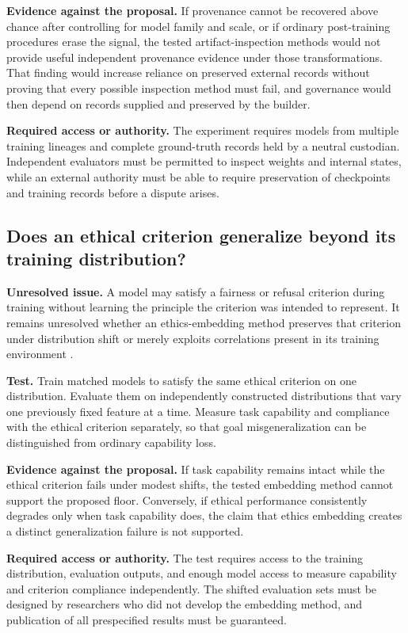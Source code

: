 \textbf{Evidence against the proposal.}
If provenance cannot be recovered above chance after controlling for model family and scale, or if ordinary post-training procedures erase the signal, the tested artifact-inspection methods would not provide useful independent provenance evidence under those transformations. That finding would increase reliance on preserved external records without proving that every possible inspection method must fail, and governance would then depend on records supplied and preserved by the builder.

\textbf{Required access or authority.}
The experiment requires models from multiple training lineages and complete ground-truth records held by a neutral custodian. Independent evaluators must be permitted to inspect weights and internal states, while an external authority must be able to require preservation of checkpoints and training records before a dispute arises.

\subsection*{Does an ethical criterion generalize beyond its training distribution?}
\label{sec:A.shift}
\textbf{Unresolved issue.}
A model may satisfy a fairness or refusal criterion during training without learning the principle the criterion was intended to represent. It remains unresolved whether an ethics-embedding method preserves that criterion under distribution shift or merely exploits correlations present in its training environment \autocite{krakovna2020specification,langosco2022goal}.

\textbf{Test.}
Train matched models to satisfy the same ethical criterion on one distribution. Evaluate them on independently constructed distributions that vary one previously fixed feature at a time. Measure task capability and compliance with the ethical criterion separately, so that goal misgeneralization can be distinguished from ordinary capability loss.

\textbf{Evidence against the proposal.}
If task capability remains intact while the ethical criterion fails under modest shifts, the tested embedding method cannot support the proposed floor. Conversely, if ethical performance consistently degrades only when task capability does, the claim that ethics embedding creates a distinct generalization failure is not supported.

\textbf{Required access or authority.}
The test requires access to the training distribution, evaluation outputs, and enough model access to measure capability and criterion compliance independently. The shifted evaluation sets must be designed by researchers who did not develop the embedding method, and publication of all prespecified results must be guaranteed.

